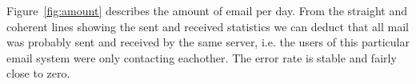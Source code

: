 Figure~\ref{fig:amount} describes the amount of email per day. From the
straight and coherent lines showing the sent and received statistics we
can deduct that all mail was probably sent and received by the same
server, i.e. the users of this particular email system were only
contacting eachother. The error rate is stable and fairly close to
zero.\newline
